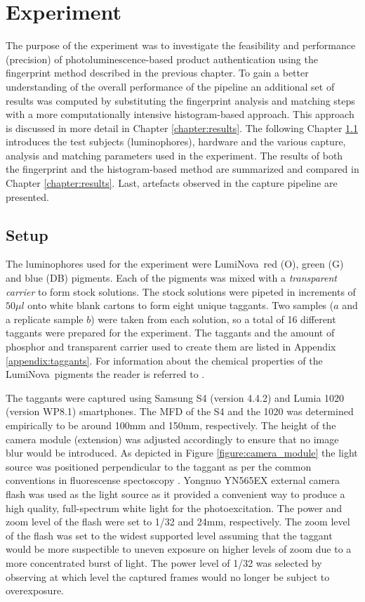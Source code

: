 \documentclass[thesis.tex]{subfiles}
\begin{document}
\chapter{Experiment}
\label{chapter:experiment}

The purpose of the experiment was to investigate the feasibility and performance (precision) of photoluminescence-based product authentication using the fingerprint method described in the previous chapter. To gain a better understanding of the overall performance of the pipeline an additional set of results was computed by substituting the fingerprint analysis and matching steps with a more computationally intensive histogram-based approach. This approach is discussed in more detail in Chapter \ref{chapter:results}. The following Chapter \ref{chapter:setup} introduces the test subjects (luminophores), hardware and the various capture, analysis and matching parameters used in the experiment. The results of both the fingerprint and the histogram-based method are summarized and compared in Chapter \ref{chapter:results}. Last, artefacts observed in the capture pipeline are presented.

\section{Setup}
\label{chapter:setup}

The luminophores used for the experiment were LumiNova\textregistered\ red (O), green (G) and blue (DB) pigments. Each of the pigments was mixed with a \emph{transparent carrier} to form stock solutions. The stock solutions were pipeted in increments of $50\mu l$ onto white blank cartons to form eight unique taggants. Two samples ($a$ and a replicate sample $b$) were taken from each solution, so a total of 16 different taggants were prepared for the experiment. The taggants and the amount of phosphor and transparent carrier used to create them are listed in Appendix \ref{appendix:taggants}. For information about the chemical properties of the LumiNova\textregistered\ pigments the reader is referred to \cite{luminova}.

The taggants were captured using Samsung S4 (version 4.4.2) and Lumia 1020 (version WP8.1) smartphones. The MFD of the S4 and the 1020 was determined empirically to be around 100mm and 150mm, respectively. The height of the camera module (extension) was adjusted accordingly to ensure that no image blur would be introduced. As depicted in Figure \ref{figure:camera_module} the light source was positioned perpendicular to the taggant as per the common conventions in fluorescense spectoscopy \cite{spectroscopy-principles}. Yongnuo YN565EX external camera flash was used as the light source as it provided a convenient way to produce a high quality, full-spectrum white light for the photoexcitation. The power and zoom level of the flash were set to 1/32 and 24mm, respectively. The zoom level of the flash was set to the widest supported level assuming that the taggant would be more suspectible to uneven exposure on higher levels of zoom due to a more concentrated burst of light. The power level of 1/32 was selected by observing at which level the captured frames would no longer be subject to overexposure.
\end{document}
